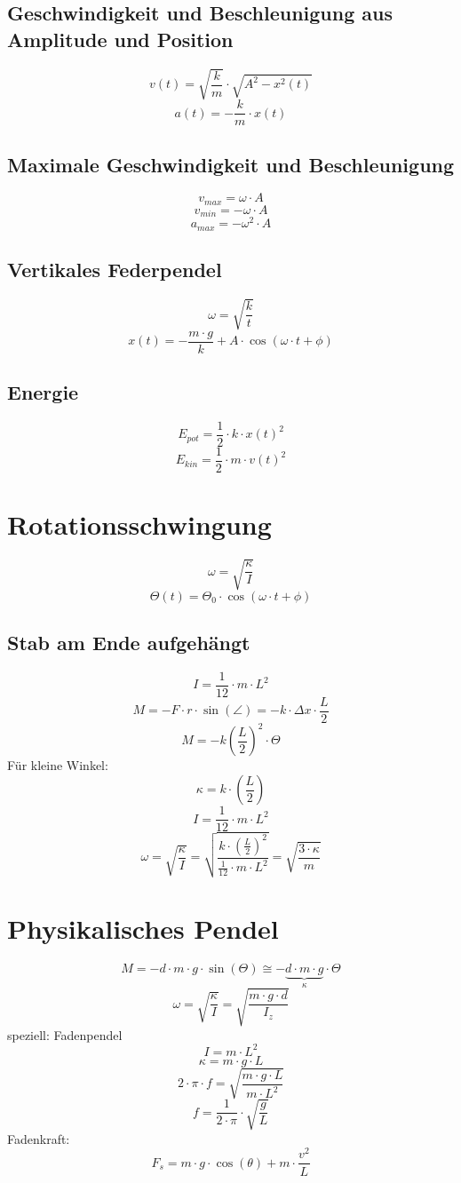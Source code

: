 \subsection{Geschwindigkeit und Beschleunigung aus Amplitude und Position}
\[ \boxed{v(t) = \sqrt{\frac{k}{m}} \cdot \sqrt{A^2 - x^2(t)}} \]
\[ \boxed{a(t) = - \frac{k}{m} \cdot x(t)} \]

\subsection{Maximale Geschwindigkeit und Beschleunigung}
\[ \boxed{v_{max} = \omega \cdot A} \]
\[ \boxed{v_{min} = -\omega \cdot A} \]
\[ \boxed{a_{max} = -\omega^2 \cdot A} \]

\subsection{Vertikales Federpendel}
\[ \boxed{\omega = \sqrt{\frac{k}{t}}} \]
\[ \boxed{x(t) = - \frac{m \cdot g}{k} + A \cdot \cos(\omega \cdot t + \phi)} \]

\subsection{Energie}
\[ \boxed{E_{pot} = \frac{1}{2} \cdot k \cdot x(t)^2} \]
\[ \boxed{E_{kin} = \frac{1}{2} \cdot m \cdot v(t)^2} \]

\section{Rotationsschwingung}
\[ \boxed{\omega = \sqrt{\frac{\kappa}{I}}} \]
\[ \boxed{\Theta(t) = \Theta_0 \cdot \cos(\omega \cdot t + \phi)} \]

\subsection{Stab am Ende aufgehängt}
\[ \boxed{I = \frac{1}{12} \cdot m \cdot L^2} \]
\[ \boxed{M = -F \cdot r \cdot \sin(\angle) = -k \cdot \Delta x \cdot \frac{L}{2}} \]
\[ \boxed{M = -k \left(\frac{L}{2}\right)^2 \cdot \Theta} \]
Für kleine Winkel: 
\[ \boxed{\kappa = k \cdot \left(\frac{L}{2}\right)} \]
\[ \boxed{I = \frac{1}{12} \cdot m \cdot L^2} \]
\[ \boxed{\omega = \sqrt{\frac{\kappa}{I}} 
= \sqrt{\frac{k \cdot \left(\frac{L}{2}\right)^2}{\frac{1}{12}\cdot m \cdot L^2}} 
= \sqrt{\frac{3 \cdot \kappa}{m}}} \]

\section{Physikalisches Pendel}
\[ \boxed{M = -d \cdot m \cdot g \cdot \sin(\Theta) 
\cong - \underbrace{d \cdot m \cdot g}_{\kappa} \cdot \Theta} \]
\[ \boxed{\omega = \sqrt{\frac{\kappa}{I}} 
= \sqrt{\frac{m \cdot g \cdot d}{I_z}}} \]
speziell: Fadenpendel
\[ \boxed{I = m \cdot L^2} \]
\[ \boxed{\kappa = m \cdot g \cdot L} \]
\[ \boxed{2 \cdot \pi \cdot f = \sqrt{\frac{m \cdot g \cdot L}{m \cdot L^2}}} \]
\[ \boxed{f = \frac{1}{2 \cdot \pi} \cdot \sqrt{\frac{g}{L}}} \]
Fadenkraft: 
\[ \boxed{F_s = m \cdot g \cdot \cos(\theta) + m \cdot \frac{v^2}{L}} \]